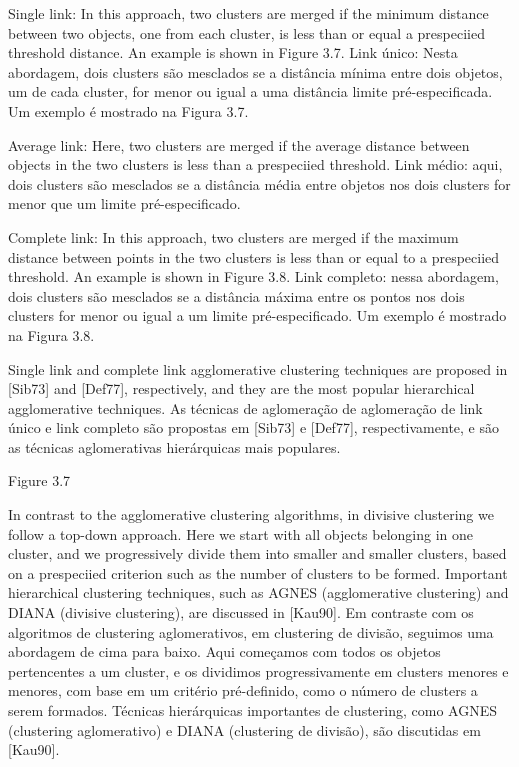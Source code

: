 Single link: In this approach, two clusters are merged if the minimum distance between two objects, one from each cluster, is less than or equal a prespeciied threshold distance. An example is shown in Figure 3.7.
Link único: Nesta abordagem, dois clusters são mesclados se a distância mínima entre dois objetos, um de cada cluster, for menor ou igual a uma distância limite pré-especificada. Um exemplo é mostrado na Figura 3.7.

Average link: Here, two clusters are merged if the average distance between objects in the two clusters is less than a prespeciied
threshold.
Link médio: aqui, dois clusters são mesclados se a distância média entre objetos nos dois clusters for menor que um limite pré-especificado.

Complete link: In this approach, two clusters are merged if the maximum distance between points in the two clusters is less than or equal to a prespeciied threshold. An example is shown in Figure 3.8.
Link completo: nessa abordagem, dois clusters são mesclados se a distância máxima entre os pontos nos dois clusters for menor ou igual a um limite pré-especificado. Um exemplo é mostrado na Figura 3.8.

Single link and complete link agglomerative clustering techniques are proposed in [Sib73] and [Def77], respectively, and they are the most popular hierarchical agglomerative techniques.
As técnicas de aglomeração de aglomeração de link único e link completo são propostas em [Sib73] e [Def77], respectivamente, e são as técnicas aglomerativas hierárquicas mais populares.

Figure 3.7

In contrast to the agglomerative clustering algorithms, in divisive clustering we follow a top-down approach. Here we start with all objects belonging in one cluster, and we progressively divide them into smaller and smaller clusters, based on a prespeciied criterion such as the number of clusters to be formed. Important hierarchical clustering techniques, such as AGNES (agglomerative clustering) and DIANA (divisive clustering), are discussed in [Kau90].
Em contraste com os algoritmos de clustering aglomerativos, em clustering de divisão, seguimos uma abordagem de cima para baixo. Aqui começamos com todos os objetos pertencentes a um cluster, e os dividimos progressivamente em clusters menores e menores, com base em um critério pré-definido, como o número de clusters a serem formados. Técnicas hierárquicas importantes de clustering, como AGNES (clustering aglomerativo) e DIANA (clustering de divisão), são discutidas em [Kau90].


